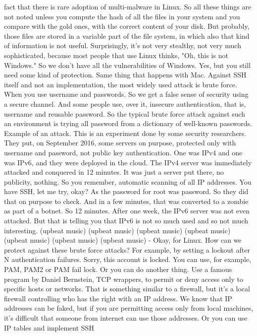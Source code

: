  fact that there is rare adoption of multi-malware in Linux. So all these
 things are not noted unless you compute the hash of all the files in your
 system and you compare with the gold ones, with the correct content of your
 disk. But probably, those files are stored in a variable part of the file
 system, in which also that kind of information is not useful. Surprisingly,
 it's not very stealthy, not very much sophisticated, because most people that
 use Linux thinks, "Oh, this is not Windows." So we don't have all the
 vulnerabilities of Windows. Yes, but you still need some kind of protection.
 Same thing that happens with Mac. Against SSH itself and not an
 implementation, the most widely used attack is brute force. When you use
 username and passwords. So we get a false sense of security using a secure
 channel. And some people use, over it, insecure authentication, that is,
 username and reusable password. So the typical brute force attack against such
 an environment is trying all password from a dictionary of well-known
 passwords. Example of an attack. This is an experiment done by some security
 researchers. They put, on September 2016, some servers on purpose, protected
 only with username and password, not public key authentication. One was IPv4
 and one was IPv6, and they were deployed in the cloud. The IPv4 server was
 immediately attacked and conquered in 12 minutes. It was just a server put
 there, no publicity, nothing. So you remember, automatic scanning of all IP
 addresses. You have SSH, let me try, okay? As the password for root was
 password. So they did that on purpose to check. And in a few minutes, that was
 converted to a zombie as part of a botnet. So 12 minutes. After one week, the
 IPv6 server was not even attacked. But that is telling you that IPv6 is not so
 much used and so not much interesting. (upbeat music) (upbeat music) (upbeat
 music) (upbeat music) (upbeat music) (upbeat music) (upbeat music) - Okay, for
 Linux. How can we protect against these brute force attacks? For example, by
 setting a lockout after N authentication failures. Sorry, this account is
 locked. You can use, for example, PAM, PAM2 or PAM fail lock. Or you can do
 another thing. Use a famous program by Daniel Bernstein, TCP wrappers, to
 permit or deny access only to specific hosts or networks. That is something
 similar to a firewall, but it's a local firewall controlling who has the right
 with an IP address. We know that IP addresses can be faked, but if you are
 permitting access only from local machines, it's difficult that someone from
 internet can use those addresses. Or you can use IP tables and implement SSH
